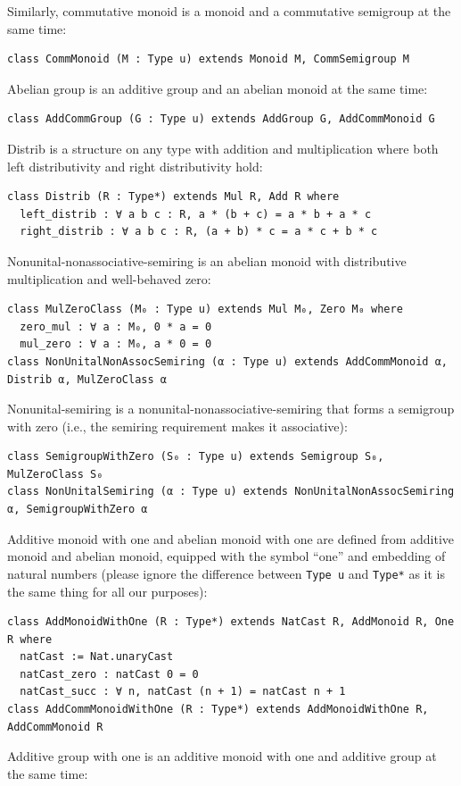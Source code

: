 \documentclass[]{article}
\renewcommand{\.}{\hskip .75pt}
\begin{document}
Similarly, commutative monoid is a monoid and a commutative semigroup at the same time:
\begin{lstlisting}
class CommMonoid (M : Type u) extends Monoid M, CommSemigroup M
\end{lstlisting}
Abelian group is an additive group and an abelian monoid at the same time:
\begin{lstlisting}
class AddCommGroup (G : Type u) extends AddGroup G, AddCommMonoid G
\end{lstlisting}
Distrib is a structure on any type with addition and multiplication where
both left distributivity and right distributivity hold:
\begin{lstlisting}
class Distrib (R : Type*) extends Mul R, Add R where
  left_distrib : ∀ a b c : R, a * (b + c) = a * b + a * c
  right_distrib : ∀ a b c : R, (a + b) * c = a * c + b * c
\end{lstlisting}
Nonunital-nonassociative-semiring is an abelian monoid with distributive multiplication and well-behaved zero:
\begin{lstlisting}
class MulZeroClass (M₀ : Type u) extends Mul M₀, Zero M₀ where
  zero_mul : ∀ a : M₀, 0 * a = 0
  mul_zero : ∀ a : M₀, a * 0 = 0
class NonUnitalNonAssocSemiring (α : Type u) extends AddCommMonoid α, Distrib α, MulZeroClass α
\end{lstlisting}
Nonunital-semiring is a nonunital-nonassociative-semiring that forms a semigroup with zero (i.e., the
semiring requirement makes it associative):
\begin{lstlisting}
class SemigroupWithZero (S₀ : Type u) extends Semigroup S₀, MulZeroClass S₀
class NonUnitalSemiring (α : Type u) extends NonUnitalNonAssocSemiring α, SemigroupWithZero α
\end{lstlisting}
Additive monoid with one and abelian monoid with one are defined from additive monoid
and abelian monoid, equipped with the symbol ``one'' and embedding of natural numbers
(please ignore the difference between \texttt{Type u} and \texttt{Type*} as it is the same thing
for all our purposes):
\begin{lstlisting}
class AddMonoidWithOne (R : Type*) extends NatCast R, AddMonoid R, One R where
  natCast := Nat.unaryCast
  natCast_zero : natCast 0 = 0
  natCast_succ : ∀ n, natCast (n + 1) = natCast n + 1 
class AddCommMonoidWithOne (R : Type*) extends AddMonoidWithOne R, AddCommMonoid R
\end{lstlisting}
Additive group with one is an additive monoid with one and additive group at the same time:
\end{document}
